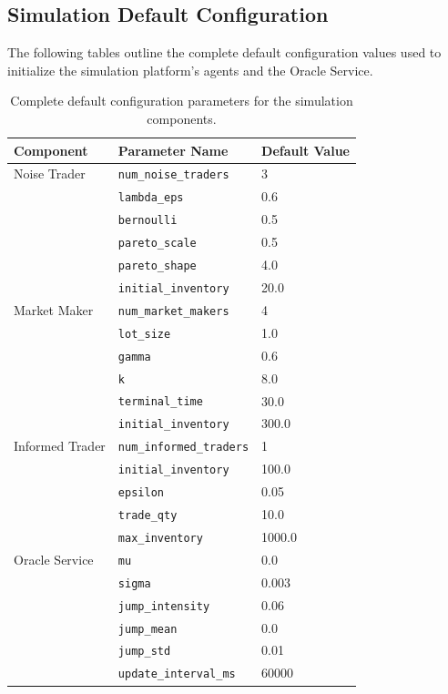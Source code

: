 \documentclass[12pt,a4paper]{article}
\begin{document}
\subsection{Simulation Default Configuration}
\label{sec:appendix_sim_config}
The following tables outline the complete default configuration values used to initialize the simulation platform's agents and the Oracle Service.

\begin{table}[H]
    \centering
    \renewcommand{\arraystretch}{1.2}
    \begin{tabular}{|l|l|l|}
        \hline
        \textbf{Component} & \textbf{Parameter Name} & \textbf{Default Value} \\
        \hline
        Noise Trader & \texttt{num\_noise\_traders} & 3 \\
        & \texttt{lambda\_eps} & 0.6 \\
        & \texttt{bernoulli} & 0.5 \\
        & \texttt{pareto\_scale} & 0.5 \\
        & \texttt{pareto\_shape} & 4.0 \\
        & \texttt{initial\_inventory} & 20.0 \\
        \hline
        Market Maker & \texttt{num\_market\_makers} & 4 \\
        & \texttt{lot\_size} & 1.0 \\
        & \texttt{gamma} & 0.6 \\
        & \texttt{k} & 8.0 \\
        & \texttt{terminal\_time} & 30.0 \\
        & \texttt{initial\_inventory} & 300.0 \\
        \hline
        Informed Trader & \texttt{num\_informed\_traders} & 1 \\
        & \texttt{initial\_inventory} & 100.0 \\
        & \texttt{epsilon} & 0.05 \\
        & \texttt{trade\_qty} & 10.0 \\
        & \texttt{max\_inventory} & 1000.0 \\
        \hline
        Oracle Service & \texttt{mu} & 0.0 \\
        & \texttt{sigma} & 0.003 \\
        & \texttt{jump\_intensity} & 0.06 \\
        & \texttt{jump\_mean} & 0.0 \\
        & \texttt{jump\_std} & 0.01 \\
        & \texttt{update\_interval\_ms} & 60000 \\
        \hline
    \end{tabular}
    \caption{Complete default configuration parameters for the simulation components.}
    \label{tab:full_sim_configs}
\end{table}
\end{document}
